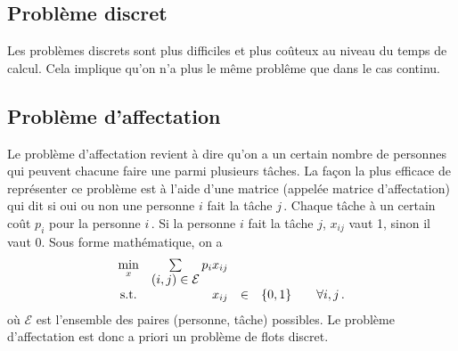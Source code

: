 \subsection{Problème discret}

	Les problèmes discrets sont plus difficiles et plus coûteux
	au niveau du temps de calcul.
	Cela implique qu'on n'a plus le même problême que dans le cas continu.

\subsection{Problème d'affectation}
\label{sec:affectation}

	\begin{center}
	\end{center}

	Le problème d'affectation revient à dire
	qu'on a un certain nombre de personnes
	qui peuvent chacune faire une parmi plusieurs tâches.
	La façon la plus efficace de représenter ce problème
	est à l'aide d'une matrice (appelée matrice d'affectation)
	qui dit si oui ou non une personne $i$
	fait la tâche $j\,$.
	Chaque tâche à un certain coût $p_i$ pour la personne $i\,$.
	Si la personne $i$ fait la tâche $j$, $x_{ij}$ vaut 1,
	sinon il vaut 0.
	Sous forme mathématique, on a
	\begin{equation*}
	\begin{array}{c@{\quad} r c l@{\qquad} l}
		\min\limits_{x} & \sum\limits_{{\displaystyle (i,j) \in \mathcal{E}}} p_i x_{ij} &&&\\
		\textnormal{s.t.} & x_{ij} & \in & \{0, 1\} & \forall i,j\,.
	\end{array}
	\end{equation*}
	où $\mathcal{E}$ est l'ensemble
	des paires (personne, tâche) possibles.
	Le problème d'affectation est donc a priori
	un problème de flots discret.
